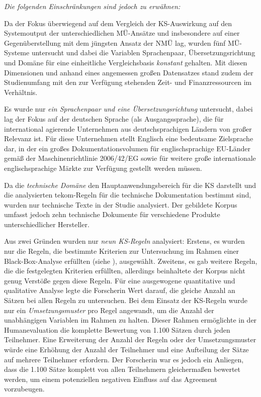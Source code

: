 \textit{Die folgenden Einschränkungen sind jedoch zu erwähnen:}

Da der Fokus überwiegend auf dem Vergleich der KS-Auswirkung auf den Systemoutput der unterschiedlichen MÜ-Ansätze und insbesondere auf einer Gegenüberstellung mit dem jüngsten Ansatz der NMÜ lag, wurden fünf MÜ-Systeme untersucht und dabei die Variablen Sprachenpaar, Übersetzungsrichtung und Domäne für eine einheitliche Vergleichsbasis \textit{konstant} gehalten. Mit diesen Dimensionen und anhand eines angemessen großen Datensatzes stand zudem der Studienumfang mit den zur Verfügung stehenden Zeit- und Finanzressourcen im Verhältnis.

Es wurde nur \textit{ein Sprachenpaar und eine Übersetzungsrichtung} untersucht, dabei lag der Fokus auf der deutschen Sprache (als Ausgangssprache), die für international agierende Unternehmen aus deutschsprachigen Ländern von großer Relevanz ist. Für diese Unternehmen stellt Englisch eine bedeutsame Zielsprache dar, in der ein großes Dokumentationsvolumen für englischsprachige EU-Länder gemäß der Maschinenrichtlinie 2006/42/EG sowie für weitere große internationale englischsprachige Märkte zur Verfügung gestellt werden müssen.

Da die \textit{technische Domäne} den Hauptanwendungsbereich für die KS darstellt und die analysierten tekom-Regeln für die technische Dokumentation bestimmt sind, wurden nur technische Texte in der Studie analysiert. Der gebildete Korpus umfasst jedoch zehn technische Dokumente für verschiedene Produkte unterschiedlicher Hersteller.

Aus zwei Gründen wurden nur \textit{neun KS-Regeln} analysiert: Erstens, es wurden nur die Regeln, die bestimmte Kriterien zur Untersuchung im Rahmen einer Black-Box-Analyse erfüllten (siehe ), ausgewählt. Zweitens, es gab weitere Regeln, die die festgelegten Kriterien erfüllten, allerdings beinhaltete der Korpus nicht genug Verstöße gegen diese Regeln. Für eine ausgewogene quantitative und qualitative Analyse legte die Forscherin Wert darauf, die gleiche Anzahl an Sätzen bei allen Regeln zu untersuchen. Bei dem Einsatz der KS-Regeln wurde nur ein \textit{Umsetzungsmuster} pro Regel angewandt, um die Anzahl der unabhängigen Variablen im Rahmen zu halten. Dieser Rahmen ermöglichte in der Humanevaluation die komplette Bewertung von 1.100 Sätzen durch jeden Teilnehmer. Eine Erweiterung der Anzahl der Regeln oder der Umsetzungsmuster würde eine Erhöhung der Anzahl der Teilnehmer und eine Aufteilung der Sätze auf mehrere Teilnehmer erfordern. Der Forscherin war es jedoch ein Anliegen, dass die 1.100 Sätze komplett von allen Teilnehmern gleichermaßen bewertet werden, um einem potenziellen negativen Einfluss auf das Agreement vorzubeugen.

